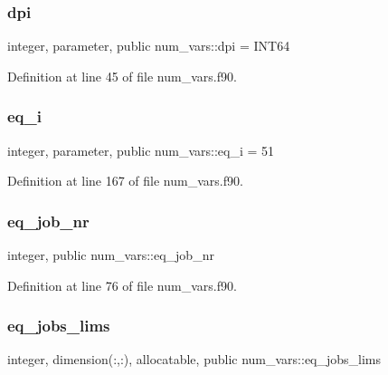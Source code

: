 \mbox{\label{namespacenum__vars_a7e4915cb055749f1170afaa77b055cd5}} 
\subsubsection{\texorpdfstring{dpi}{dpi}}
{\footnotesize\ttfamily integer, parameter, public num\+\_\+vars\+::dpi = I\+N\+T64}



Definition at line 45 of file num\+\_\+vars.\+f90.

\mbox{\label{namespacenum__vars_a7b97a4fd25cbf874cbfe63417ba307ff}} 
\subsubsection{\texorpdfstring{eq\+\_\+i}{eq\_i}}
{\footnotesize\ttfamily integer, parameter, public num\+\_\+vars\+::eq\+\_\+i = 51}



Definition at line 167 of file num\+\_\+vars.\+f90.

\mbox{\label{namespacenum__vars_adfff3a032694d6c26e780019772d4cc1}} 
\subsubsection{\texorpdfstring{eq\+\_\+job\+\_\+nr}{eq\_job\_nr}}
{\footnotesize\ttfamily integer, public num\+\_\+vars\+::eq\+\_\+job\+\_\+nr}



Definition at line 76 of file num\+\_\+vars.\+f90.

\mbox{\label{namespacenum__vars_a725aecf3a6f55fee53a5fe3b759d6a25}} 
\subsubsection{\texorpdfstring{eq\+\_\+jobs\+\_\+lims}{eq\_jobs\_lims}}
{\footnotesize\ttfamily integer, dimension(\+:,\+:), allocatable, public num\+\_\+vars\+::eq\+\_\+jobs\+\_\+lims}



